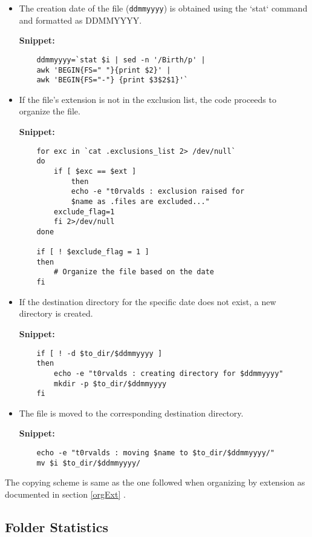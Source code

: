 \documentclass[12pt]{article}
\begin{document}
\begin{enumerate}
\begin{itemize}
          \item The creation date of the file (\texttt{ddmmyyyy}) is obtained using the `stat` command and formatted as DDMMYYYY.
          
          \textbf{Snippet:}
    \begin{verbatim}
    ddmmyyyy=`stat $i | sed -n '/Birth/p' | 
    awk 'BEGIN{FS=" "}{print $2}' | 
    awk 'BEGIN{FS="-"} {print $3$2$1}'`
    \end{verbatim}
          
          \item If the file's extension is not in the exclusion list, the code proceeds to organize the file.
          
          \textbf{Snippet:}
          \begin{verbatim}
    for exc in `cat .exclusions_list 2> /dev/null`
    do
        if [ $exc == $ext ]
            then
            echo -e "t0rvalds : exclusion raised for 
            $name as .files are excluded..."
        exclude_flag=1
        fi 2>/dev/null
    done
          
    if [ ! $exclude_flag = 1 ]
    then
        # Organize the file based on the date
    fi
    \end{verbatim}
          
          \item If the destination directory for the specific date does not exist, a new directory is created.
          
          \textbf{Snippet:}
    \begin{verbatim}
    if [ ! -d $to_dir/$ddmmyyyy ]
    then
        echo -e "t0rvalds : creating directory for $ddmmyyyy"
        mkdir -p $to_dir/$ddmmyyyy
    fi
    \end{verbatim}
          
          \item The file is moved to the corresponding destination directory.
          
          \textbf{Snippet:}
    \begin{verbatim}
    echo -e "t0rvalds : moving $name to $to_dir/$ddmmyyyy/"
    mv $i $to_dir/$ddmmyyyy/
    \end{verbatim}
        \end{itemize}
    \end{enumerate}
    The copying scheme is same as the one followed when organizing by extension as documented in section \ref{orgExt} .

    \subsection{Folder Statistics}
    
\end{document}
